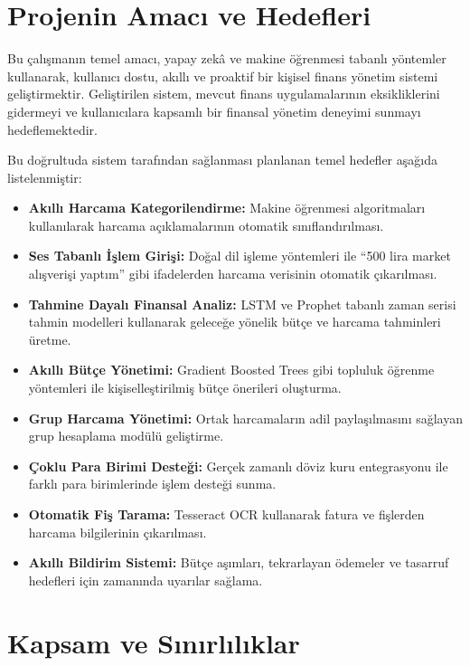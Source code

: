 \section{Projenin Amacı ve Hedefleri}

Bu çalışmanın temel amacı, yapay zekâ ve makine öğrenmesi tabanlı yöntemler kullanarak, kullanıcı dostu, akıllı ve proaktif bir kişisel finans yönetim sistemi geliştirmektir. Geliştirilen sistem, mevcut finans uygulamalarının eksikliklerini gidermeyi ve kullanıcılara kapsamlı bir finansal yönetim deneyimi sunmayı hedeflemektedir.

Bu doğrultuda sistem tarafından sağlanması planlanan temel hedefler aşağıda listelenmiştir:

\begin{itemize}
    \item \textbf{Akıllı Harcama Kategorilendirme:} Makine öğrenmesi algoritmaları kullanılarak harcama açıklamalarının otomatik sınıflandırılması.
    \item \textbf{Ses Tabanlı İşlem Girişi:} Doğal dil işleme yöntemleri ile ``500 lira market alışverişi yaptım'' gibi ifadelerden harcama verisinin otomatik çıkarılması.
    \item \textbf{Tahmine Dayalı Finansal Analiz:} LSTM ve Prophet tabanlı zaman serisi tahmin modelleri kullanarak geleceğe yönelik bütçe ve harcama tahminleri üretme.
    \item \textbf{Akıllı Bütçe Yönetimi:} Gradient Boosted Trees gibi topluluk öğrenme yöntemleri ile kişiselleştirilmiş bütçe önerileri oluşturma.
    \item \textbf{Grup Harcama Yönetimi:} Ortak harcamaların adil paylaşılmasını sağlayan grup hesaplama modülü geliştirme.
    \item \textbf{Çoklu Para Birimi Desteği:} Gerçek zamanlı döviz kuru entegrasyonu ile farklı para birimlerinde işlem desteği sunma.
    \item \textbf{Otomatik Fiş Tarama:} Tesseract OCR kullanarak fatura ve fişlerden harcama bilgilerinin çıkarılması.
    \item \textbf{Akıllı Bildirim Sistemi:} Bütçe aşımları, tekrarlayan ödemeler ve tasarruf hedefleri için zamanında uyarılar sağlama.
\end{itemize}

\section{Kapsam ve Sınırlılıklar}

